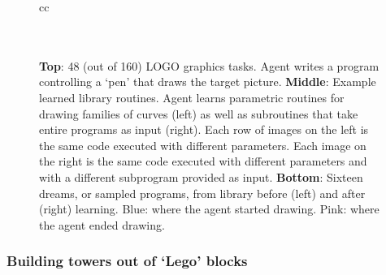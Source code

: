 \documentclass{article}
\begin{document}
\begin{figure}
\begin{tabular}{cc}
    \\\bottomrule \\\\
  \end{tabular}
  \caption{\textbf{Top}: 48 (out of 160) LOGO graphics tasks. Agent writes a program controlling a `pen' that draws the target picture. \textbf{Middle}: Example learned library routines. Agent learns parametric routines for drawing families of curves (left) as well as subroutines that take entire programs as input (right). Each row of images on the left is the same code executed with different parameters. Each image on the right is the same code executed with different parameters and with a different subprogram provided as input. \textbf{Bottom}: Sixteen dreams, or sampled programs, from library before (left) and after (right) learning. Blue: where the agent started drawing. Pink: where the agent ended drawing.}\label{logoMaster}
  \end{figure}

\subsubsection{Building towers out of `Lego' blocks}\label{towerSection}
\end{document}
